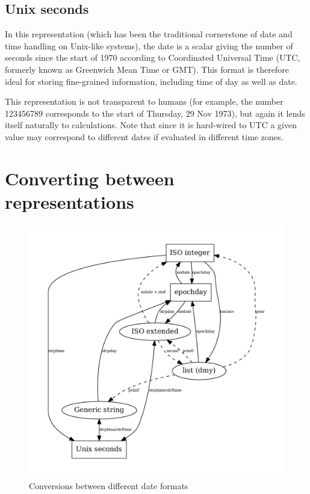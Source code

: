 \subsection{Unix seconds}
\label{sec:cal-seconds}

In this representation (which has been the traditional cornerstone of
date and time handling on Unix-like systems), the date is a scalar
giving the number of seconds since the start of 1970 according to
Coordinated Universal Time (UTC, formerly known as Greenwich Mean Time
or GMT). This format is therefore ideal for storing fine-grained
information, including time of day as well as date.

This representation is not transparent to humans (for example, the
number 123456789 corresponds to the start of Thursday, 29 Nov 1973),
but again it lends itself naturally to calculations. Note that since
it is hard-wired to UTC a given value may correspond to different
dates if evaluated in different time zones.

\section{Converting between representations}
\label{sec:cal-conversions}

\begin{figure}[htbp]
  \centering
  \includegraphics[scale=0.667]{figures/date-conversion}
  \caption{Conversions between different date formats}
  \label{fig:cal-conversions}
\end{figure}

